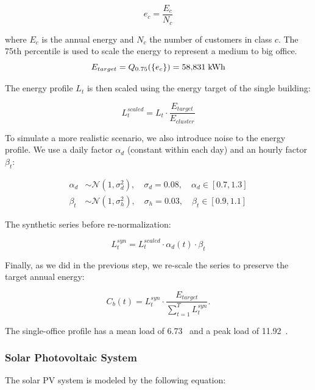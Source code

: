 \begin{equation}
e_c = \frac{E_c}{N_c}
\end{equation}

where $E_c$ is the annual energy and $N_c$ the number of customers in class $c$. The 75th percentile is used to scale the energy to represent a medium to big office.
\begin{equation}
E_{target} = Q_{0.75}\!\left(\{e_c\}\right) = 58{,}831 \; \text{\text{kWh}}
\end{equation}

The energy profile $L_t$ is then scaled using the energy target of the single building:

\begin{equation}
L_t^{scaled} = L_t \cdot \frac{E_{target}}{E_{cluster}}
\end{equation}

To simulate a more realistic scenario, we also introduce noise to the energy profile. We use a daily factor $\alpha_d$ (constant within each day) and an hourly factor $\beta_t$:

\begin{align}
\alpha_d &\sim \mathcal{N}(1, \sigma_d^2), \quad \sigma_d = 0.08, \quad \alpha_d \in [0.7, 1.3] \\
\beta_t &\sim \mathcal{N}(1, \sigma_h^2), \quad \sigma_h = 0.03, \quad \beta_t \in [0.9, 1.1]
\end{align}

The synthetic series before re-normalization:

\begin{equation}
L_t^{syn} = L_t^{scaled} \cdot \alpha_d(t) \cdot \beta_t
\end{equation}

Finally, as we did in the previous step, we re-scale the series to preserve the target annual energy:

\begin{equation}
C_b(t) = L_t^{syn} \cdot \frac{E_{target}}{\sum_{t=1}^{T} L_t^{syn}}.
\label{eq:building_consumption}
\end{equation}

The single-office profile has a mean load of 6.73~\kw{} and a peak load of 11.92~\kw.

\subsubsection{Solar Photovoltaic System}

The solar PV system is modeled by the following equation:

